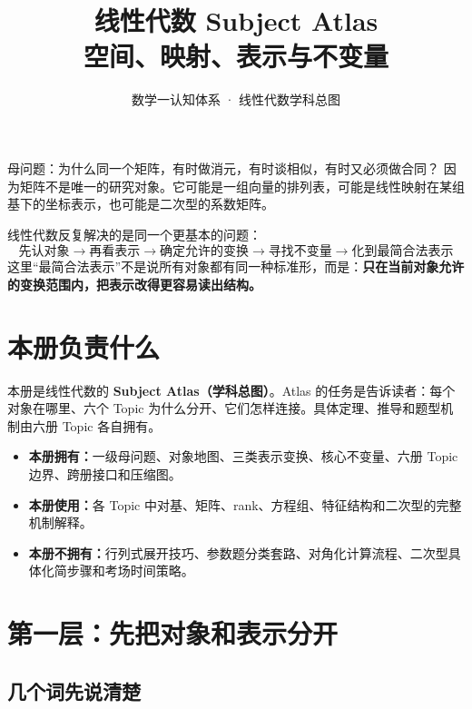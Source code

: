 \documentclass[11pt,a4paper]{ctexart}
\title{\vspace{-1.1cm}\textbf{线性代数 Subject Atlas}\\[0.4em]
\large 空间、映射、表示与不变量}
\author{数学一认知体系 · 线性代数学科总图}
\date{}
\newcommand{\kw}[1]{\textbf{\color{deep}#1}}
\begin{document}
\maketitle

\begin{corebox}{母问题：为什么同一个矩阵，有时做消元，有时谈相似，有时又必须做合同？}
因为矩阵不是唯一的研究对象。它可能是一组向量的排列表，可能是线性映射在某组基下的坐标表示，也可能是二次型的系数矩阵。

线性代数反复解决的是同一个更基本的问题：
\[
\boxed{
\text{先认对象}
\to \text{再看表示}
\to \text{确定允许的变换}
\to \text{寻找不变量}
\to \text{化到最简合法表示}
}
\]
这里“最简合法表示”不是说所有对象都有同一种标准形，而是：\kw{只在当前对象允许的变换范围内，把表示改得更容易读出结构。}
\end{corebox}

\section{本册负责什么}

本册是线性代数的 \kw{Subject Atlas（学科总图）}。Atlas 的任务是告诉读者：每个对象在哪里、六个 Topic 为什么分开、它们怎样连接。具体定理、推导和题型机制由六册 Topic 各自拥有。

\begin{itemize}
  \item \kw{本册拥有：}一级母问题、对象地图、三类表示变换、核心不变量、六册 Topic 边界、跨册接口和压缩图。
  \item \kw{本册使用：}各 Topic 中对基、矩阵、rank、方程组、特征结构和二次型的完整机制解释。
  \item \kw{本册不拥有：}行列式展开技巧、参数题分类套路、对角化计算流程、二次型具体化简步骤和考场时间策略。
\end{itemize}

\section{第一层：先把对象和表示分开}

\subsection{几个词先说清楚}
\end{document}
